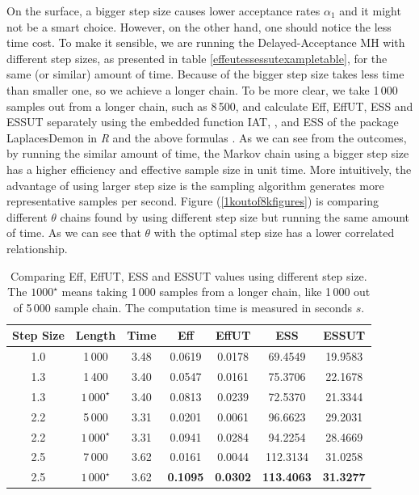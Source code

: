 On the surface, a bigger step size causes lower acceptance rates $\alpha_1$ and it might not be a smart choice. However, on the other hand, one should notice the less time cost. To make it sensible, we are running the Delayed-Acceptance MH with different step sizes, as presented in table \ref{effeutessessutexampletable},  for the same (or similar) amount of time. Because of the bigger step size takes less time than smaller one, so we achieve a longer chain. To be more clear, we take 1\,000 samples out from a longer chain, such as 8\,500, and calculate Eff, EffUT, ESS and ESSUT separately using the embedded function \textsf{IAT}, \cite{christen2010general}, and \textsf{ESS} of the package \textsf{LaplacesDemon} in \textit{R} and the above formulas . As we can see from the outcomes, by running the similar amount of time, the Markov chain using a bigger step size has a higher efficiency and effective sample size in unit time. More intuitively, the advantage of using larger step size is the sampling algorithm generates more representative samples per second. Figure (\ref{1koutof8kfigures}) is comparing different $\theta$ chains found by using different step size but running the same amount of time. As we can see that $\theta$ with the optimal step size has a lower correlated relationship. 
\begin{table}[h]
\centering
\begin{tabular}{|c|c|c|c|c|c|c|}
\hline
Step Size& Length & Time & Eff   & EffUT & ESS & ESSUT \\ \hline
1.0    &   1\,000        & 3.48   & 0.0619 & 0.0178   &  69.4549     & 19.9583   \\ \hline
1.3    &   1\,400        & 3.40   & 0.0547 & 0.0161   &  75.3706   & 22.1678 \\ \hline
1.3    &   $1\,000^\star$ & 3.40 & 0.0813 & 0.0239  & 72.5370  & 21.3344   \\ \hline
2.2    &   5\,000          &  3.31 & 0.0201 &  0.0061  &  96.6623    & 29.2031   \\ \hline
2.2    &   $1\,000^\star$ & 3.31  &  0.0941 & 0.0284 & 94.2254 &  28.4669 \\ \hline
2.5    &   7\,000          &  3.62  & 0.0161 &0.0044  & 112.3134   &  31.0258    \\ \hline
2.5    &   $1\,000^\star$ &  3.62 & \textbf{0.1095} &  \textbf{0.0302}  &  \textbf{113.4063} & \textbf{31.3277} \\ \hline
\end{tabular}
\caption{Comparing Eff, EffUT, ESS and ESSUT values using different step size. The $1000^\star$ means taking 1\,000 samples from a longer chain, like 1\,000 out of 5\,000 sample chain. The computation time is measured in seconds $s$.}
\label{stepsizecompare}
\end{table}


